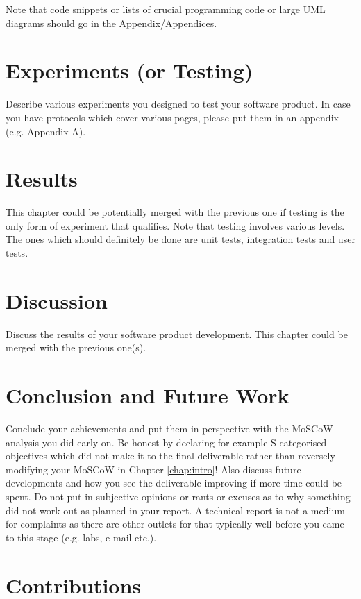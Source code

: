 \documentclass[a4paper, oneside, 11pt]{report}
\begin{document}
Note that code snippets or lists of crucial programming code or large UML diagrams should go in the Appendix/Appendices.


\chapter{Experiments (or Testing)}

Describe various experiments you designed to test your software product. In case you have protocols which cover various pages, please put them in an appendix (e.g. Appendix A).

\chapter{Results}

This chapter could be potentially merged with the previous one if testing is the only form of experiment that qualifies. Note that testing involves various levels. The ones which should definitely be done are unit tests, integration tests and user tests.

\chapter{Discussion}

Discuss the results of your software product development. This chapter could be merged with the previous one(s).

\chapter{Conclusion and Future Work}

Conclude your achievements and put them in perspective with the MoSCoW analysis you did early on. Be honest by declaring for example S categorised objectives which did not make it to the final deliverable rather than reversely modifying your MoSCoW in Chapter \ref{chap:intro}! Also discuss future developments and how you see the deliverable improving if more time could be spent. Do not put in subjective opinions or rants or excuses as to why something did not work out as planned in your report. A technical report is not a medium for complaints as there are other outlets for that typically well before you came to this stage (e.g. labs, e-mail etc.).





\chapter*{Contributions}
\end{document}

